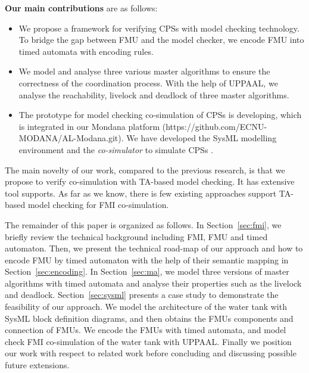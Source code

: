 \textbf{Our main contributions} are as follows:
\begin{itemize}
\item
We propose a framework for verifying CPSs with model checking technology. To bridge the gap between FMU and the model checker, we encode FMU into timed automata with encoding rules.
\item
We model and analyse three various master algorithms to ensure the correctness of the coordination process. With the help of UPPAAL, we analyse the reachability, livelock and deadlock of three master algorithms.
\item
The prototype for model checking co-simulation of CPSs is developing, which is integrated in our Mondana platform \cite{Cheng2015Modana}(https://github.com/ECNU-MODANA/AL-Modana.git). We have developed the SysML modelling environment and the \textit{co-simulator} to simulate CPSs \cite{Fritzson1998Modelica}.
\end{itemize}
The main novelty of our work, compared to the previous research, is that we propose to verify co-simulation with TA-based model checking. It has extensive tool supports. As far as we know, there is few existing approaches support TA-based model checking for FMI co-simulation.

The remainder of this paper is organized as follows. In Section~\ref{sec:fmi}, we briefly review the technical background including FMI, FMU and timed automaton. Then, we present the technical road-map of our approach and how to encode FMU by timed automaton with the help of their semantic mapping in Section~\ref{sec:encoding}. In Section~\ref{sec:ma}, we model three versions of master algorithms with timed automata and analyse their properties such as the livelock and deadlock. Section~\ref{sec:sysml} presents a case study to demonstrate the feasibility of our approach. We model the architecture of the water tank with SysML block definition diagrams, and then obtains the FMUs components and connection of FMUs. We encode the FMUs with timed automata, and model check FMI co-simulation of the water tank with UPPAAL. Finally we position our work with respect to related work before concluding and discussing possible future extensions.




















